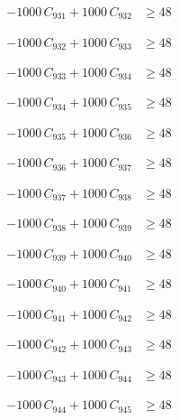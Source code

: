 \documentclass[a4paper,11pt]{article}
\begin{document}
\begin{align}
-1000\,C_{931} + 1000\,C_{932} &\geq 48 \nonumber
\end{align}

\begin{align}
-1000\,C_{932} + 1000\,C_{933} &\geq 48 \nonumber
\end{align}

\begin{align}
-1000\,C_{933} + 1000\,C_{934} &\geq 48 \nonumber
\end{align}

\begin{align}
-1000\,C_{934} + 1000\,C_{935} &\geq 48 \nonumber
\end{align}

\begin{align}
-1000\,C_{935} + 1000\,C_{936} &\geq 48 \nonumber
\end{align}

\begin{align}
-1000\,C_{936} + 1000\,C_{937} &\geq 48 \nonumber
\end{align}

\begin{align}
-1000\,C_{937} + 1000\,C_{938} &\geq 48 \nonumber
\end{align}

\begin{align}
-1000\,C_{938} + 1000\,C_{939} &\geq 48 \nonumber
\end{align}

\begin{align}
-1000\,C_{939} + 1000\,C_{940} &\geq 48 \nonumber
\end{align}

\begin{align}
-1000\,C_{940} + 1000\,C_{941} &\geq 48 \nonumber
\end{align}

\begin{align}
-1000\,C_{941} + 1000\,C_{942} &\geq 48 \nonumber
\end{align}

\begin{align}
-1000\,C_{942} + 1000\,C_{943} &\geq 48 \nonumber
\end{align}

\begin{align}
-1000\,C_{943} + 1000\,C_{944} &\geq 48 \nonumber
\end{align}

\begin{align}
-1000\,C_{944} + 1000\,C_{945} &\geq 48 \nonumber
\end{align}
\end{document}
